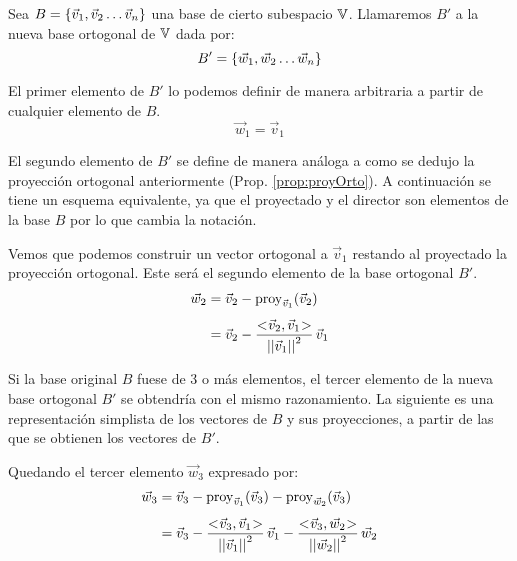 Sea $B={ \left\{ {\Vec{v}_1 , \Vec{v}_2 \dots \Vec{v}_n} \right\} }$ una base de cierto subespacio $\mathbb{V}$.
Llamaremos $B'$ a la nueva base ortogonal de $\mathbb{V}$ dada por:
\begin{equation*}
    B' = { \left\{ {\Vec{w}_1 , \Vec{w}_2 \dots \Vec{w}_n} \right\} }
\end{equation*}

El primer elemento de $B'$ lo podemos definir de manera arbitraria a partir de cualquier elemento de $B$.
\begin{equation*}
    \Vec{w}_1 = \Vec{v}_1
\end{equation*}

El segundo elemento de $B'$ se define de manera análoga a como se dedujo la proyección ortogonal anteriormente (Prop. \ref{prop:proyOrto}).
A continuación se tiene un esquema equivalente, ya que el proyectado y el director son elementos de la base $B$ por lo que cambia la notación.

\begin{center}
    \def\svgwidth{0.6\linewidth}
    
\end{center}

Vemos que podemos construir un vector ortogonal a $\Vec{v}_1$ restando al proyectado la proyección ortogonal.
Este será el segundo elemento de la base ortogonal $B'$.
\begin{align*}
    \Vec{w}_2 &= \Vec{v}_2 - \operatorname{proy}_{\Vec{v}_1}(\Vec{v}_2)
    \\[1ex]
    &= \Vec{v}_2 - \frac{<\hspace{-0.8mm}\Vec{v}_2,\Vec{v}_1\hspace{-0.8mm}>}{{\left|\left| {\Vec{v}_1} \right|\right|}^2} \, \Vec{v}_1
\end{align*}

Si la base original $B$ fuese de 3 o más elementos, el tercer elemento de la nueva base ortogonal $B'$ se obtendría con el mismo razonamiento.
La siguiente es una representación simplista de los vectores de $B$ y sus proyecciones, a partir de las que se obtienen los vectores de $B'$.

\begin{center}
    \def\svgwidth{0.6\linewidth}
    
\end{center}

Quedando el tercer elemento $\Vec{w}_3$ expresado por:
\begin{align*}
    \Vec{w}_3 &= \Vec{v}_3 - \operatorname{proy}_{\Vec{v}_1}(\Vec{v}_3) - \operatorname{proy}_{\Vec{w}_2}(\Vec{v}_3)
    \\[1ex]
    &= \Vec{v}_3 - \frac{<\hspace{-0.8mm}\Vec{v}_3,\Vec{v}_1\hspace{-0.8mm}>}{{\left|\left| {\Vec{v}_1} \right|\right|}^2} \, \Vec{v}_1 - \frac{<\hspace{-0.8mm}\Vec{v}_3,\Vec{w}_2\hspace{-0.8mm}>}{{\left|\left| {\Vec{w}_2} \right|\right|}^2} \, \Vec{w}_2
\end{align*}

